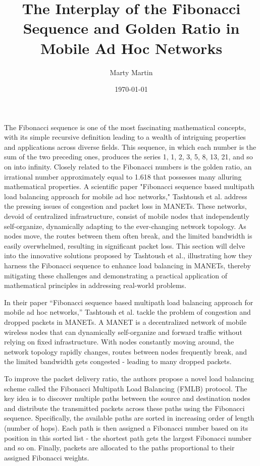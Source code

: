 \documentclass[12pt]{article}
\title{The Interplay of the Fibonacci Sequence and Golden Ratio in Mobile Ad Hoc Networks}
\author{Marty Martin}
\date{\today}
\begin{document}
\maketitle
\thispagestyle{empty}
\clearpage

\setcounter{page}{1}
\doublespacing %

The Fibonacci sequence is one of the most fascinating mathematical concepts, with its simple recursive definition leading to a wealth of intriguing properties and applications across diverse fields. This sequence, in which each number is the sum of the two preceding ones, produces the series 1, 1, 2, 3, 5, 8, 13, 21, and so on into infinity. Closely related to the Fibonacci numbers is the golden ratio, an irrational number approximately equal to 1.618 that possesses many alluring mathematical properties. A scientific paper "Fibonacci sequence based multipath load balancing approach for mobile ad hoc networks," Tashtoush et al. address the pressing issues of congestion and packet loss in MANETs. These networks, devoid of centralized infrastructure, consist of mobile nodes that independently self-organize, dynamically adapting to the ever-changing network topology. As nodes move, the routes between them often break, and the limited bandwidth is easily overwhelmed, resulting in significant packet loss. This section will delve into the innovative solutions proposed by Tashtoush et al., illustrating how they harness the Fibonacci sequence to enhance load balancing in MANETs, thereby mitigating these challenges and demonstrating a practical application of mathematical principles in addressing real-world problems.

In their paper ``Fibonacci sequence based multipath load balancing approach for mobile ad hoc networks,'' Tashtoush et al. tackle the problem of congestion and dropped packets in MANETs. A MANET is a decentralized network of mobile wireless nodes that can dynamically self-organize and forward traffic without relying on fixed infrastructure. With nodes constantly moving around, the network topology rapidly changes, routes between nodes frequently break, and the limited bandwidth gets congested - leading to many dropped packets.

To improve the packet delivery ratio, the authors propose a novel load balancing scheme called the Fibonacci Multipath Load Balancing (FMLB) protocol. The key idea is to discover multiple paths between the source and destination nodes and distribute the transmitted packets across these paths using the Fibonacci sequence. Specifically, the available paths are sorted in increasing order of length (number of hops). Each path is then assigned a Fibonacci number based on its position in this sorted list - the shortest path gets the largest Fibonacci number and so on. Finally, packets are allocated to the paths proportional to their assigned Fibonacci weights.
\end{document}
